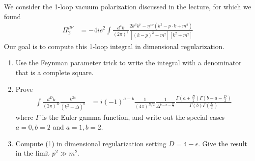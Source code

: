 \documentclass[10pt,a4paper]{article}
\theoremstyle{definition}
\begin{document}
{\color{blue} We consider the 1-loop vacuum polarization discussed in the lecture, for which we found
\begin{align}
\Pi_2^{\mu\nu}
&=-4ie^2\int\frac{d^4k}{(2\pi)^4}\frac{2k^\mu k^\nu-\eta^{\mu\nu}(k^2-p\cdot k+m^2)}{[(k-p)^2+m^2][k^2+m^2]} \tag{1}
\end{align}
Our goal is to compute this 1-loop integral in dimensional regularization.
\begin{enumerate}
\item Use the Feynman parameter trick to write the integral with a denominator that is a complete square.

\item Prove
\begin{align}
\int\frac{d^Dk}{(2\pi)^D}\frac{k^{2a}}{(k^2-\Delta)^b}
&=i(-1)^{a-b}\frac{1}{(4\pi)^{D/2}}\frac{1}{\Delta^{b-a-\frac{D}{2}}}\frac{\Gamma\left(a+\frac{D}{2}\right)\Gamma\left(b-a-\frac{D}{2}\right)}{\Gamma\left(b\right)\Gamma\left(\frac{D}{2}\right)} \tag{2}
\end{align}
where $\Gamma$ is the Euler gamma function, and write out the special cases $a= 0,b=2$ and $a=1,b=2$.

\item Compute (1) in dimensional regularization setting $D = 4-\epsilon$. Give the result in the limit $p^2\gg m^2$.
\end{enumerate}
}
\end{document}

